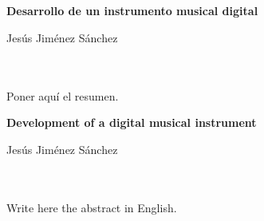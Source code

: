 
\chapter*{}   %

\cleardoublepage
\thispagestyle{empty}

\begin{center}
    {\large\bfseries Desarrollo de un instrumento musical digital}\\
\end{center}

\begin{center}
    Jesús Jiménez Sánchez\\
\end{center}

\\

\vspace{0.7cm}
\\

Poner aquí el resumen.

\cleardoublepage

\thispagestyle{empty}

\begin{center}
       {\large\bfseries Development of a digital musical instrument}\\
\end{center}

\begin{center}
    Jesús Jiménez Sánchez\\
\end{center}

\\

\vspace{0.7cm}
\\

Write here the abstract in English.

\chapter*{}   %

